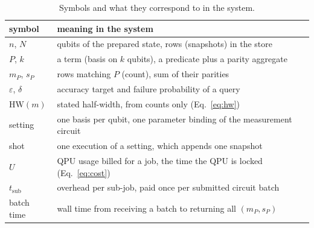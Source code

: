 \begin{table}[t]
\centering
\caption{Symbols and what they correspond to in the system.}\label{tab:notation}
\small\setlength{\tabcolsep}{3pt}
\begin{tabular}{lp{6.4cm}}
\hline
symbol & meaning in the system \\
\hline
$n$, $N$ & qubits of the prepared state, rows (snapshots) in the store \\
$P$, $k$ & a term (basis on $k$ qubits), a predicate plus a parity aggregate \\
$m_P$, $s_P$ & rows matching $P$ (count), sum of their parities \\
$\varepsilon$, $\delta$ & accuracy target and failure probability of a query \\
$\mathrm{HW}(m)$ & stated half-width, from counts only (Eq.~\ref{eq:hw}) \\
setting & one basis per qubit, one parameter binding of the measurement circuit \\
shot & one execution of a setting, which appends one snapshot \\
$U$ & QPU usage billed for a job, the time the QPU is locked (Eq.~\ref{eq:cost}) \\
$t_{\mathrm{sub}}$ & overhead per sub-job, paid once per submitted circuit batch \\
batch time & wall time from receiving a batch to returning all $(m_P,s_P)$ \\
\hline
\end{tabular}
\end{table}


